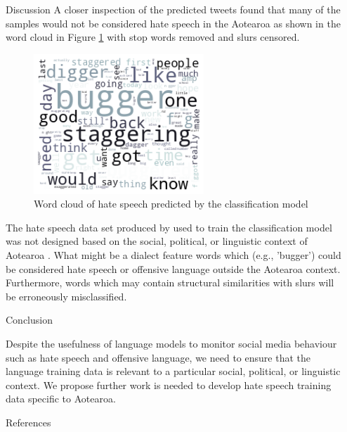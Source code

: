 \documentclass[final]{beamer}
\newlength{\sepwidth}
\newlength{\smallcolwidth}
\newcommand{\separatorcolumn}{\begin{column}{\sepwidth}\end{column}}
\begin{document}
\begin{frame}[t]
\begin{columns}[t]
\begin{column}{\smallcolwidth}
\begin{block}{Discussion}
  A closer inspection of the predicted tweets found that many of the samples would not be considered hate speech in the Aotearoa as shown in the word cloud in Figure \ref{fig:4} with stop words removed and slurs censored.
  
  \begin{figure}
    \includegraphics[width=0.6\textwidth]{figures/word_cloud.png}
        \caption{Word cloud of hate speech predicted by the classification model}
        \label{fig:4}    
    \end{figure}

    \end{block}

    The hate speech data set produced by  used to train the classification model was not designed based on the social, political, or linguistic context of Aotearoa \cite{davidson_automated_2017}. What might be a dialect feature words which  (e.g., 'bugger') could be considered hate speech or offensive language outside the Aotearoa context. Furthermore, words which may contain structural similarities with slurs will be erroneously misclassified.
    
    \begin{block}{Conclusion}

    Despite the usefulness of language models to monitor social media behaviour such as hate speech and offensive language, we need to ensure that the language training data is relevant to a particular social, political, or linguistic context. We propose further work is needed to develop hate speech training data specific to Aotearoa.
    
  \end{block}

  \begin{block}{References}

    \nocite{*}
    \footnotesize{}

  \end{block}

\end{column}

\separatorcolumn
\end{columns}
\end{frame}
\end{document}
